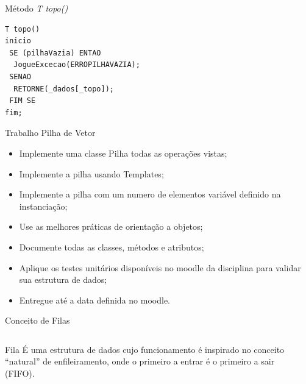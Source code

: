 \documentclass[12pt,table,xcolor={dvipsnames}]{beamer}
\begin{document}
\begin{frame}[fragile]{Método \textit{T topo()}}
\begin{lstlisting}
T topo()
inicio
 SE (pilhaVazia) ENTAO
  JogueExcecao(ERROPILHAVAZIA);
 SENAO
  RETORNE(_dados[_topo]);
 FIM SE
fim;
\end{lstlisting}
\end{frame}

\begin{frame}[fragile]{Trabalho Pilha de Vetor}
\begin{itemize}
\item Implemente uma classe Pilha todas as operações vistas;
\item Implemente a pilha usando Templates;
\item Implemente a pilha com um numero de elementos variável definido na instanciação;
\item Use as melhores práticas de orientação a objetos;
\item Documente todas as classes, métodos e atributos;
\item Aplique os testes unitários disponíveis no moodle da disciplina para validar sua estrutura de dados;
\item Entregue até a data definida no moodle.
\end{itemize}
\end{frame}

\begin{frame}{Conceito de Filas}
\begin{columns}
\begin{block}{Fila}
É uma estrutura de dados cujo funcionamento é inspirado no conceito “natural” de enfileiramento, onde o primeiro a entrar é o primeiro a sair (FIFO).
\end{block}
\begin{center}
\end{center}
\end{columns}
\end{frame}
\end{document}
